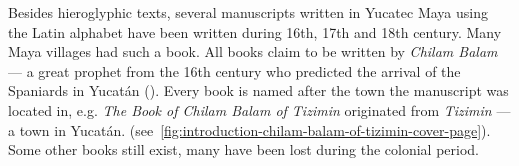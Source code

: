 \documentclass[../main.tex]{subfiles}
\begin{document}
Besides hieroglyphic texts, several manuscripts written in Yucatec Maya using the Latin alphabet 
have been written  during 16th, 17th and 18th century.
Many Maya villages had such a book.
All books claim to be written by \emph{Chilam Balam} --- a great prophet from the 16th century
who predicted the arrival of the Spaniards in Yucat\'{a}n
().
Every book is named after the town the manuscript was located in, e.g. 
\emph{The Book of Chilam Balam of Tizimin} originated from \emph{Tizimin} --- a town 
in Yucat\'{a}n.
(see~\ref{fig:introduction-chilam-balam-of-tizimin-cover-page}).
Some other books still exist, many have been lost during the colonial period.
\end{document}
